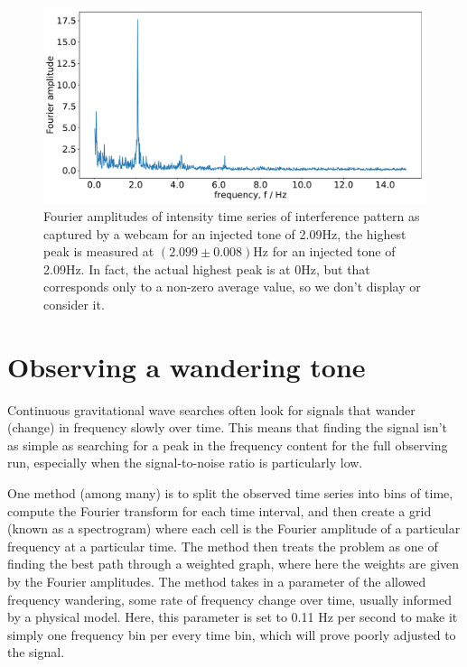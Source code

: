 \documentclass[prb,preprint]{revtex4-1}
\begin{document}
\begin{figure}
	\includegraphics[width=\textwidth]{figures/webcam_expt_4_0209-cropped.pdf}
	\caption{Fourier amplitudes of intensity time series of interference pattern as captured by a webcam for an injected tone of 2.09Hz, the highest peak is measured at $(2.099\pm 0.008) \mathrm{Hz}$ for an injected tone of 2.09Hz. In fact, the actual highest peak is at 0Hz, but that corresponds only to a non-zero average value, so we don’t display or consider it.}
	\label{fig:webcam_spectrum}
\end{figure}

\section{Observing a wandering tone}
\label{sec:viterbi_wandering}

Continuous gravitational wave searches often look for signals that wander (change) in frequency slowly over time\cite{2019PhRvD.100l2002A}. This means that finding the signal isn’t as simple as searching for a peak in the frequency content for the full observing run, especially when the signal-to-noise ratio is particularly low.

One method (among many) is to split the observed time series into bins of time, compute the Fourier transform for each time interval, and then create a grid (known as a spectrogram) where each cell is the Fourier amplitude of a particular frequency at a particular time.
The method then treats the problem as one of finding the best path through a weighted graph, where here the weights are given by the Fourier amplitudes.
The method takes in a parameter of the allowed frequency wandering, some rate of frequency change over time, usually informed by a physical model. Here, this parameter is set to 0.11 Hz per second to make it simply one frequency bin per every time bin, which will prove poorly adjusted to the signal.
\end{document}
